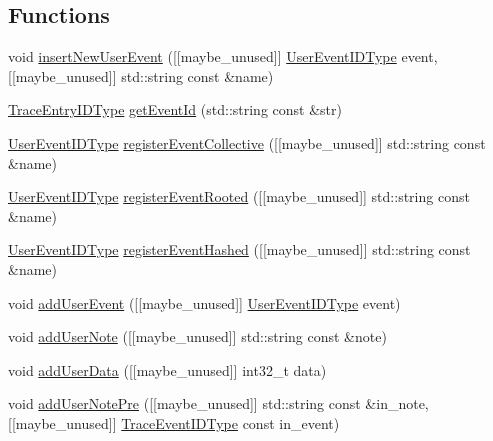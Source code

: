\subsection*{Functions}
\begin{DoxyCompactItemize}
\item 
void \hyperlink{namespacevt_1_1trace_ad8215db5be893bda922be84a8bc586e2}{insert\+New\+User\+Event} (\mbox{[}\mbox{[}maybe\+\_\+unused\mbox{]}\mbox{]} \hyperlink{namespacevt_1_1trace_a5908920d051c144c89f17c69ed262350}{User\+Event\+I\+D\+Type} event, \mbox{[}\mbox{[}maybe\+\_\+unused\mbox{]}\mbox{]} std\+::string const \&name)
\item 
\hyperlink{namespacevt_1_1trace_a3c14050715ba9eceaeff51fb3de64f2f}{Trace\+Entry\+I\+D\+Type} \hyperlink{namespacevt_1_1trace_ac7c4c6c55b38e5c03f0e541946bcf375}{get\+Event\+Id} (std\+::string const \&str)
\item 
\hyperlink{namespacevt_1_1trace_a5908920d051c144c89f17c69ed262350}{User\+Event\+I\+D\+Type} \hyperlink{namespacevt_1_1trace_ac5d9cb0fb4e3151a7d613bac126c2143}{register\+Event\+Collective} (\mbox{[}\mbox{[}maybe\+\_\+unused\mbox{]}\mbox{]} std\+::string const \&name)
\item 
\hyperlink{namespacevt_1_1trace_a5908920d051c144c89f17c69ed262350}{User\+Event\+I\+D\+Type} \hyperlink{namespacevt_1_1trace_a52a73af92d5434f89ee960e8830f09ea}{register\+Event\+Rooted} (\mbox{[}\mbox{[}maybe\+\_\+unused\mbox{]}\mbox{]} std\+::string const \&name)
\item 
\hyperlink{namespacevt_1_1trace_a5908920d051c144c89f17c69ed262350}{User\+Event\+I\+D\+Type} \hyperlink{namespacevt_1_1trace_aefbbd34012ffc01030aad7e3ed1b05ae}{register\+Event\+Hashed} (\mbox{[}\mbox{[}maybe\+\_\+unused\mbox{]}\mbox{]} std\+::string const \&name)
\item 
void \hyperlink{namespacevt_1_1trace_a780c57bc3a00801318ce086479b05251}{add\+User\+Event} (\mbox{[}\mbox{[}maybe\+\_\+unused\mbox{]}\mbox{]} \hyperlink{namespacevt_1_1trace_a5908920d051c144c89f17c69ed262350}{User\+Event\+I\+D\+Type} event)
\item 
void \hyperlink{namespacevt_1_1trace_ab2de61fae25783f0f209470372c8f6d8}{add\+User\+Note} (\mbox{[}\mbox{[}maybe\+\_\+unused\mbox{]}\mbox{]} std\+::string const \&note)
\item 
void \hyperlink{namespacevt_1_1trace_ab2821c4abac4417f0c9e88c67ed57435}{add\+User\+Data} (\mbox{[}\mbox{[}maybe\+\_\+unused\mbox{]}\mbox{]} int32\+\_\+t data)
\item 
void \hyperlink{namespacevt_1_1trace_aa40ddb76a423d7455cddc67d1ec809e5}{add\+User\+Note\+Pre} (\mbox{[}\mbox{[}maybe\+\_\+unused\mbox{]}\mbox{]} std\+::string const \&in\+\_\+note, \mbox{[}\mbox{[}maybe\+\_\+unused\mbox{]}\mbox{]} \hyperlink{namespacevt_1_1trace_a64a7185f3e102df8d8258f263ccd1582}{Trace\+Event\+I\+D\+Type} const in\+\_\+event)

\end{DoxyCompactItemize}
